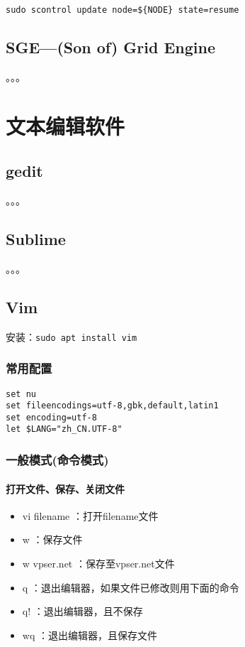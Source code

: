 {\verb|sudo scontrol update node=${NODE} state=resume|



\subsection{SGE—(Son of) Grid Engine}
。。。




\section{文本编辑软件}
\subsection{gedit}
。。。


\subsection{Sublime}
。。。

\subsection{Vim}
安装：\verb|sudo apt install vim|

\subsubsection{常用配置}
\begin{verbatim}
set nu
set fileencodings=utf-8,gbk,default,latin1
set encoding=utf-8
let $LANG="zh_CN.UTF-8"
\end{verbatim}


\subsubsection{一般模式(命令模式)}
\paragraph{打开文件、保存、关闭文件}
\begin{itemize}
\item vi filename ：打开filename文件
\item w ：保存文件
\item w vpser.net ：保存至vpser.net文件
\item q ：退出编辑器，如果文件已修改则用下面的命令
\item q! ：退出编辑器，且不保存
\item wq ：退出编辑器，且保存文件
\end{itemize}


}
